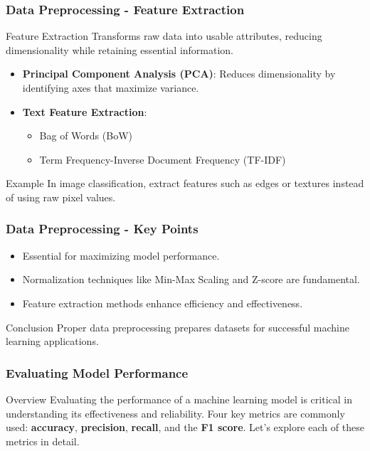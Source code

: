 \documentclass[aspectratio=169]{beamer}
\begin{document}
\begin{frame}[fragile]
    \frametitle{Data Preprocessing - Feature Extraction}
    \begin{block}{Feature Extraction}
        Transforms raw data into usable attributes, reducing dimensionality while retaining essential information.
    \end{block}

    \begin{itemize}
        \item \textbf{Principal Component Analysis (PCA)}: Reduces dimensionality by identifying axes that maximize variance.
        
        \item \textbf{Text Feature Extraction}:
        \begin{itemize}
            \item Bag of Words (BoW)
            \item Term Frequency-Inverse Document Frequency (TF-IDF)
        \end{itemize}
    \end{itemize}

    \begin{block}{Example}
        In image classification, extract features such as edges or textures instead of using raw pixel values.
    \end{block}
\end{frame}

\begin{frame}[fragile]
    \frametitle{Data Preprocessing - Key Points}
    \begin{itemize}
        \item Essential for maximizing model performance.
        \item Normalization techniques like Min-Max Scaling and Z-score are fundamental.
        \item Feature extraction methods enhance efficiency and effectiveness.
    \end{itemize}
    
    \begin{block}{Conclusion}
        Proper data preprocessing prepares datasets for successful machine learning applications.
    \end{block}
\end{frame}

\begin{frame}[fragile]
    \frametitle{Evaluating Model Performance}
    \begin{block}{Overview}
        Evaluating the performance of a machine learning model is critical in understanding its effectiveness and reliability. 
        Four key metrics are commonly used: 
        \textbf{accuracy}, \textbf{precision}, \textbf{recall}, and the \textbf{F1 score}. 
        Let's explore each of these metrics in detail.
    \end{block}
\end{frame}
\end{document}
